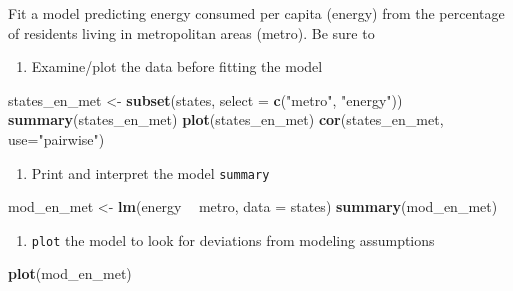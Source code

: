 \documentclass[]{book}
\newenvironment{Shaded}{\begin{snugshade}}{\end{snugshade}}
\newcommand{\KeywordTok}[1]{\textcolor[rgb]{0.13,0.29,0.53}{\textbf{#1}}}
\newcommand{\DataTypeTok}[1]{\textcolor[rgb]{0.13,0.29,0.53}{#1}}
\newcommand{\StringTok}[1]{\textcolor[rgb]{0.31,0.60,0.02}{#1}}
\newcommand{\OperatorTok}[1]{\textcolor[rgb]{0.81,0.36,0.00}{\textbf{#1}}}
\newcommand{\NormalTok}[1]{#1}
\providecommand{\tightlist}{%
  \setlength{\itemsep}{0pt}\setlength{\parskip}{0pt}}
\begin{document}
Fit a model predicting energy consumed per capita (energy) from the
percentage of residents living in metropolitan areas (metro). Be sure to

\begin{enumerate}
\def\labelenumi{\arabic{enumi}.}
\tightlist
\item
  Examine/plot the data before fitting the model
\end{enumerate}

\begin{Shaded}
\begin{Highlighting}[]
\NormalTok{  states_en_met <-}\StringTok{ }\KeywordTok{subset}\NormalTok{(states, }\DataTypeTok{select =} \KeywordTok{c}\NormalTok{(}\StringTok{"metro"}\NormalTok{, }\StringTok{"energy"}\NormalTok{))}
  \KeywordTok{summary}\NormalTok{(states_en_met)}
  \KeywordTok{plot}\NormalTok{(states_en_met)}
  \KeywordTok{cor}\NormalTok{(states_en_met, }\DataTypeTok{use=}\StringTok{"pairwise"}\NormalTok{)}
\end{Highlighting}
\end{Shaded}

\begin{enumerate}
\def\labelenumi{\arabic{enumi}.}
\setcounter{enumi}{1}
\tightlist
\item
  Print and interpret the model \texttt{summary}
\end{enumerate}

\begin{Shaded}
\begin{Highlighting}[]
\NormalTok{  mod_en_met <-}\StringTok{ }\KeywordTok{lm}\NormalTok{(energy }\OperatorTok{~}\StringTok{ }\NormalTok{metro, }\DataTypeTok{data =}\NormalTok{ states)}
  \KeywordTok{summary}\NormalTok{(mod_en_met)}
\end{Highlighting}
\end{Shaded}

\begin{enumerate}
\def\labelenumi{\arabic{enumi}.}
\setcounter{enumi}{2}
\tightlist
\item
  \texttt{plot} the model to look for deviations from modeling
  assumptions
\end{enumerate}

\begin{Shaded}
\begin{Highlighting}[]
  \KeywordTok{plot}\NormalTok{(mod_en_met)}
\end{Highlighting}
\end{Shaded}
\end{document}
